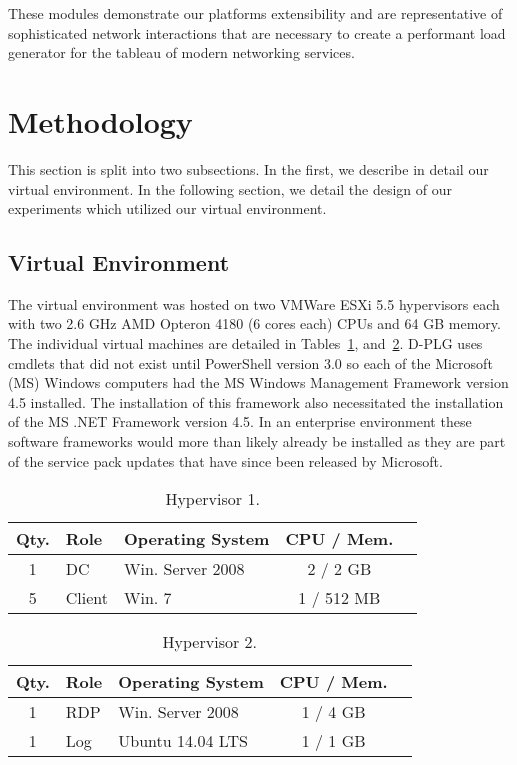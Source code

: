 These modules demonstrate our platforms extensibility and are representative of
sophisticated network interactions that are necessary to create a performant
load generator for the tableau of modern networking services.  

\section{Methodology} \label{sec:methodology} 
This section is split into two subsections.  In the first, we describe in
detail our virtual environment.  In the following section, we detail the design
of our experiments which utilized our virtual environment.

\subsection{Virtual Environment}
The virtual environment was hosted on two VMWare ESXi 5.5 hypervisors each with
two 2.6 GHz AMD Opteron 4180 (6 cores each) CPUs and 64 GB memory.  The
individual virtual machines are detailed in Tables~\ref{fig:hyp1},
and~\ref{fig:hyp2}.  D-PLG uses cmdlets that did not exist until PowerShell
version 3.0 so each of the Microsoft (MS) Windows computers had the MS Windows
Management Framework version 4.5 installed.  The installation of this framework
also necessitated the installation of the MS .NET Framework version 4.5.  In an
enterprise environment these software frameworks would more than likely already
be installed as they are part of the service pack updates that have since been
released by Microsoft.

\begin{table}[!ht] \centering
  \caption{Hypervisor 1.}
  \begin{tabular}{ | c | l | l | c | l |}
    \hline
    Qty. & Role   & Operating System & CPU / Mem. \\ \hline\hline
    1    & DC     & Win. Server 2008 & 2 / 2 GB   \\ \hline
    5    & Client & Win. 7           & 1 / 512 MB \\ 
    \hline
  \end{tabular}
  \label{fig:hyp1}
\end{table}

\begin{table}[!ht] \centering
  \caption{Hypervisor 2.}
  \begin{tabular}{ | c | l | l | c | l |}
    \hline
    Qty. & Role & Operating System & CPU / Mem. \\ \hline\hline
    1    & RDP  & Win. Server 2008 & 1 / 4 GB   \\ \hline
    1    & Log  & Ubuntu 14.04 LTS & 1 / 1 GB   \\ 
    \hline
  \end{tabular}
  \label{fig:hyp2}
\end{table}

